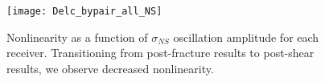 

\begin{figure}[ht]
	\centering
	\texttt{[image: Delc\_bypair\_all\_NS]}
	\caption{Nonlinearity as a function of $ \sigma_{NS} $ oscillation amplitude for each receiver. Transitioning from post-fracture results to post-shear results, we observe decreased nonlinearity.}
		\label{fig:delc_plots_ns}
\end{figure}

